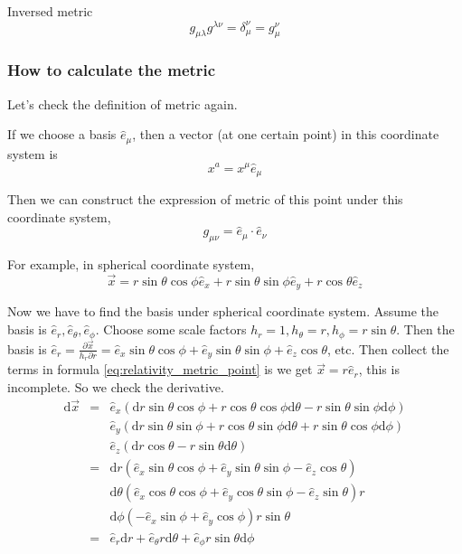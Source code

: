 \documentclass[12pt,a4paper]{book}
\begin{document}
Inversed metric
\begin{equation}
g_{\mu\lambda}g^{\lambda\nu}=\delta_\mu^\nu = g_\mu^\nu
\end{equation}





\subsubsection{How to calculate the metric}

Let's check the definition of metric again.

If we choose a basis $\hat e_\mu$, then a vector (at one certain point) in this coordinate system is
\begin{equation}
x^a=x^\mu \hat e_\mu
\end{equation}

Then we can construct the expression of metric of this point under this coordinate system,
\begin{equation}
g_{\mu\nu}=\hat e_\mu\cdot \hat e_\nu
\end{equation}

For example, in spherical coordinate system, 
\begin{equation}
\vec x=r\sin \theta\cos\phi \hat e_x+r\sin\theta\sin\phi \hat e_y+r\cos\theta \hat e_z \label{eq:relativity_metric_point}
\end{equation}



Now we have to find the basis under spherical coordinate system. Assume the basis is $\hat e_r, \hat e_\theta, \hat e_\phi$. Choose some scale factors $h_r=1, h_\theta=r, h_\phi=r\sin\theta$. Then the basis is
$\hat e_r=\frac{\partial \vec x}{h_r\partial r}=\hat e_x \sin\theta\cos\phi+\hat e_y \sin\theta\sin\phi+\hat e_z \cos\theta$, etc. Then collect the terms in formula \ref{eq:relativity_metric_point} is we get $\vec x=r\hat e_r$, this is incomplete. So we check the derivative.
\begin{eqnarray}
\mathrm d\vec x&=& \hat e_x (\mathrm dr \sin\theta\cos\phi+r\cos\theta\cos\phi\mathrm d\theta-r\sin\theta\sin\phi\mathrm d\phi)\\
&&\hat e_y (\mathrm dr\sin\theta\sin\phi+r\cos\theta\sin\phi\mathrm d\theta+r\sin\theta\cos\phi\mathrm d\phi) \\
&&\hat e_z (\mathrm dr\cos\theta-r\sin\theta\mathrm d\theta) \\
&=&\mathrm dr(\hat e_x\sin\theta\cos\phi +\hat e_y \sin\theta\sin\phi -\hat e_z \cos\theta)  \\
&&\mathrm d\theta (\hat e_x\cos\theta\cos\phi +\hat e_y \cos\theta\sin\phi - \hat e_z \sin\theta)r \\
&&\mathrm d\phi (-\hat e_x\sin\phi +\hat e_y \cos\phi)r\sin\theta  \\
&=&\hat e_r\mathrm dr+\hat e_\theta r\mathrm d\theta +\hat e_\phi r\sin\theta\mathrm d \phi
\end{eqnarray}
\end{document}
